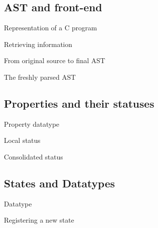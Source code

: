 \subsection{AST and front-end}
\begin{frame}{Representation of a C program}
\end{frame}
\begin{frame}{Retrieving information}
\end{frame}
\begin{frame}{From original source to final AST}
\end{frame}
\begin{frame}{The freshly parsed AST}
\end{frame}
\subsection{Properties and their statuses}
\begin{frame}{Property datatype}
\end{frame}
\begin{frame}{Local status}
\end{frame}
\begin{frame}{Consolidated status}
\end{frame}
\subsection{States and Datatypes}
\begin{frame}{Datatype}
\end{frame}
\begin{frame}{Registering a new state}
\end{frame}

